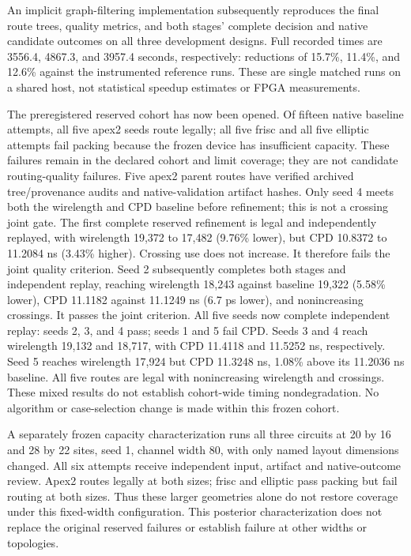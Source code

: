 \documentclass[10pt]{article}
\begin{document}
An implicit graph-filtering implementation subsequently reproduces the final
route trees, quality metrics, and both stages' complete decision and native
candidate outcomes on all three development designs. Full recorded times
are 3556.4, 4867.3, and 3957.4 seconds, respectively: reductions of
15.7\%, 11.4\%, and 12.6\% against the instrumented reference runs.
These are single matched runs on a shared host, not statistical speedup
estimates or FPGA measurements.

The preregistered reserved cohort has now been opened. Of fifteen native
baseline attempts, all five apex2 seeds route legally; all five frisc and
all five elliptic attempts fail packing because the frozen device has
insufficient capacity. These failures remain in the declared cohort and
limit coverage; they are not candidate routing-quality failures. Five
apex2 parent routes have verified archived tree/provenance audits and
native-validation artifact hashes. Only seed 4 meets both the wirelength
and CPD baseline before refinement; this is not a crossing joint gate.
The first complete reserved refinement is legal and independently replayed,
with wirelength 19,372 to 17,482 (9.76\% lower), but CPD 10.8372 to
11.2084 ns (3.43\% higher). Crossing use does not increase. It therefore
fails the joint quality criterion. Seed 2 subsequently completes both stages
and independent replay, reaching wirelength 18,243 against baseline 19,322
(5.58\% lower), CPD 11.1182 against 11.1249 ns (6.7 ps lower), and
nonincreasing crossings. It passes the joint criterion. All five seeds now
complete independent replay: seeds 2, 3, and 4 pass; seeds 1 and 5 fail CPD.
Seeds 3 and 4 reach wirelength 19,132 and 18,717, with CPD 11.4118 and
11.5252 ns, respectively. Seed 5 reaches wirelength 17,924 but CPD
11.3248 ns, 1.08\% above its 11.2036 ns baseline. All five routes are legal
with nonincreasing wirelength and crossings. These mixed results do not
establish cohort-wide timing nondegradation. No algorithm or case-selection
change is made within this frozen cohort.

A separately frozen capacity characterization runs all three circuits at
20 by 16 and 28 by 22 sites, seed 1, channel width 80, with only named
layout dimensions changed. All six attempts receive independent input,
artifact and native-outcome review. Apex2 routes legally at both sizes;
frisc and elliptic pass packing but fail routing at both sizes. Thus these
larger geometries alone do not restore coverage under this fixed-width
configuration. This posterior characterization does not replace the original
reserved failures or establish failure at other widths or topologies.
\end{document}
